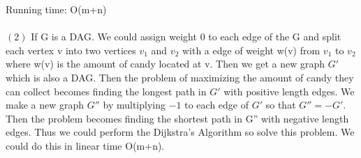 \documentclass[11pt]{article}
\begin{document}
\begin{solution}
Running time: O(m+n) \\\\
$(2)$ If G is a DAG. We could assign weight $0$ to each edge of the G and split each vertex v into two vertices $v_1$ and $v_2$ with a edge of weight w(v) from $v_1$ to $v_2$ where w(v) is the amount of candy located at v. Then we get a new graph $G'$ which is also a DAG. Then the problem of maximizing the amount of candy they can collect becomes finding the longest path in $G'$ with positive length edges. We make a new graph $G''$ by multiplying $-1$ to each edge of $G'$ so that $G'' = -G'$. Then the problem becomes finding the shortest path in G'' with negative length edges. Thus we could perform the Dijkstra's Algorithm so solve this problem. We could do this in linear time O(m+n).

\end{solution}
\end{document}
